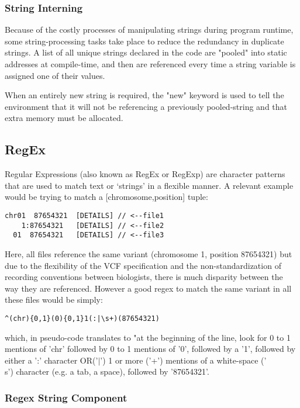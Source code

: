 \subsubsection{String Interning}

Because of the costly processes of manipulating strings during program runtime, some string-processing tasks take place to reduce the redundancy in duplicate strings. A list of all unique strings declared in the code are "pooled" into static addresses at compile-time, and then are referenced every time a string variable is assigned one of their values. 

When an entirely new string is required, the "new" keyword is used to tell the environment that it will not be referencing a previously pooled-string and that extra memory must be allocated.


\subsection{RegEx}\label{ref:app:regex}

Regular Expressions (also known as RegEx or RegExp) are character patterns that are used to match text or `strings' in a flexible manner. A relevant example would be trying to match a [chromosome,position] tuple:

\begin{lstlisting}
chr01  87654321  [DETAILS] // <--file1
    1:87654321   [DETAILS] // <--file2
  01  87654321   [DETAILS] // <--file3
\end{lstlisting}

Here, all files reference the same variant (chromosome 1, position 87654321) but due to the flexibility of the VCF specification and the non-standardization of recording conventions between biologists, there is much disparity between the way they are referenced. However a good regex to match the same variant in all these files would be simply:

\begin{lstlisting}
^(chr){0,1}(0){0,1}1(:|\s+)(87654321)
\end{lstlisting}
which, in pseudo-code translates to "at the beginning of the line, look for 0 to 1 mentions of 'chr' followed by 0 to 1 mentions of '0', followed by a '1', followed by either a ':' character OR('$\vert$')  1 or more ('+') mentions of a white-space ('\\s') character (e.g. a tab, a space), followed by '87654321'.


\subsubsection{Regex String Component}

